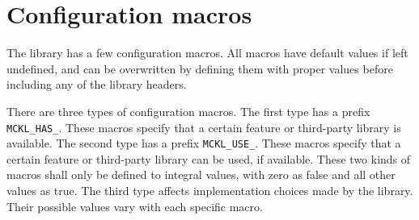%
%
%
%

\chapter{Configuration macros}
\label{chap:Configuration macros}

The library has a few configuration macros. All macros have default values if
left undefined, and can be overwritten by defining them with proper values
before including any of the library headers.

There are three types of configuration macros. The first type has a prefix
\verb|MCKL_HAS_|. These macros specify that a certain feature or third-party
library is available. The second type has a prefix \verb|MCKL_USE_|. These
macros specify that a certain feature or third-party library can be used, if
available. These two kinds of macros shall only be defined to integral values,
with zero as false and all other values as true. The third type affects
implementation choices made by the library. Their possible values vary with
each specific macro.

